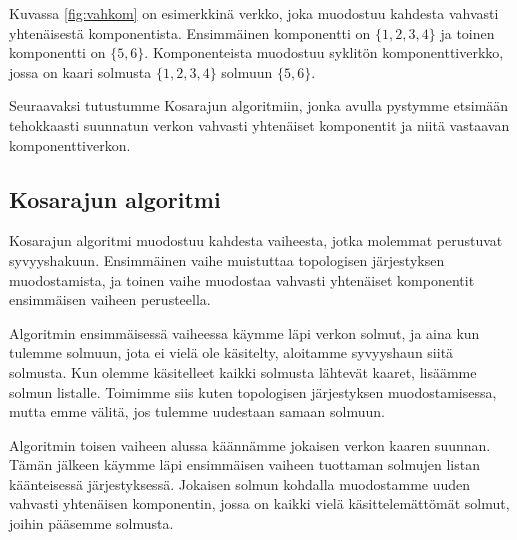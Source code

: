 Kuvassa \ref{fig:vahkom} on esimerkkinä verkko, joka muodostuu
kahdesta vahvasti yhtenäisestä komponentista.
Ensimmäinen komponentti on $\{1,2,3,4\}$
ja toinen komponentti on $\{5,6\}$.
Komponenteista muodostuu syklitön komponenttiverkko,
jossa on kaari solmusta $\{1,2,3,4\}$ solmuun $\{5,6\}$.

Seuraavaksi tutustumme Kosarajun algoritmiin,
jonka avulla pystymme etsimään tehokkaasti suunnatun
verkon vahvasti yhtenäiset komponentit ja niitä
vastaavan komponenttiverkon.

\subsection{Kosarajun algoritmi}

Kosarajun algoritmi muodostuu kahdesta vaiheesta,
jotka molemmat perustuvat syvyyshakuun.
Ensimmäinen vaihe muistuttaa topologisen järjestyksen
muodostamista, ja toinen vaihe muodostaa
vahvasti yhtenäiset komponentit ensimmäisen vaiheen perusteella.

Algoritmin ensimmäisessä vaiheessa
käymme läpi verkon solmut, ja aina kun tulemme solmuun,
jota ei vielä ole käsitelty, aloitamme syvyyshaun siitä solmusta.
Kun olemme käsitelleet kaikki solmusta lähtevät kaaret,
lisäämme solmun listalle.
Toimimme siis kuten topologisen järjestyksen muodostamisessa,
mutta emme välitä, jos tulemme uudestaan samaan solmuun.

Algoritmin toisen vaiheen alussa
käännämme jokaisen verkon kaaren suunnan.
Tämän jälkeen käymme läpi ensimmäisen vaiheen tuottaman
solmujen listan kääntei\-sessä järjestyksessä.
Jokaisen solmun kohdalla muodostamme uuden vahvasti yhtenäisen
komponentin, jossa on kaikki vielä käsittelemät\-tömät solmut,
joihin pääsemme solmusta.

